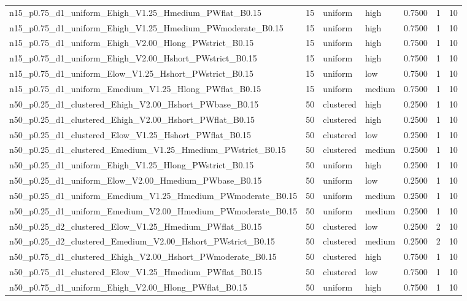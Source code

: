 \begin{tabular}{lrllrrr}
n15_p0.75_d1_uniform_Ehigh_V1.25_Hmedium_PWflat_B0.15 & 15 & uniform & high & 0.7500 & 1 & 10 \\
n15_p0.75_d1_uniform_Ehigh_V1.25_Hmedium_PWmoderate_B0.15 & 15 & uniform & high & 0.7500 & 1 & 10 \\
n15_p0.75_d1_uniform_Ehigh_V2.00_Hlong_PWstrict_B0.15 & 15 & uniform & high & 0.7500 & 1 & 10 \\
n15_p0.75_d1_uniform_Ehigh_V2.00_Hshort_PWstrict_B0.15 & 15 & uniform & high & 0.7500 & 1 & 10 \\
n15_p0.75_d1_uniform_Elow_V1.25_Hshort_PWstrict_B0.15 & 15 & uniform & low & 0.7500 & 1 & 10 \\
n15_p0.75_d1_uniform_Emedium_V1.25_Hlong_PWflat_B0.15 & 15 & uniform & medium & 0.7500 & 1 & 10 \\
n50_p0.25_d1_clustered_Ehigh_V2.00_Hshort_PWbase_B0.15 & 50 & clustered & high & 0.2500 & 1 & 10 \\
n50_p0.25_d1_clustered_Ehigh_V2.00_Hshort_PWflat_B0.15 & 50 & clustered & high & 0.2500 & 1 & 10 \\
n50_p0.25_d1_clustered_Elow_V1.25_Hshort_PWflat_B0.15 & 50 & clustered & low & 0.2500 & 1 & 10 \\
n50_p0.25_d1_clustered_Emedium_V1.25_Hmedium_PWstrict_B0.15 & 50 & clustered & medium & 0.2500 & 1 & 10 \\
n50_p0.25_d1_uniform_Ehigh_V1.25_Hlong_PWstrict_B0.15 & 50 & uniform & high & 0.2500 & 1 & 10 \\
n50_p0.25_d1_uniform_Elow_V2.00_Hmedium_PWbase_B0.15 & 50 & uniform & low & 0.2500 & 1 & 10 \\
n50_p0.25_d1_uniform_Emedium_V1.25_Hmedium_PWmoderate_B0.15 & 50 & uniform & medium & 0.2500 & 1 & 10 \\
n50_p0.25_d1_uniform_Emedium_V2.00_Hmedium_PWmoderate_B0.15 & 50 & uniform & medium & 0.2500 & 1 & 10 \\
n50_p0.25_d2_clustered_Elow_V1.25_Hmedium_PWflat_B0.15 & 50 & clustered & low & 0.2500 & 2 & 10 \\
n50_p0.25_d2_clustered_Emedium_V2.00_Hshort_PWstrict_B0.15 & 50 & clustered & medium & 0.2500 & 2 & 10 \\
n50_p0.75_d1_clustered_Ehigh_V2.00_Hshort_PWmoderate_B0.15 & 50 & clustered & high & 0.7500 & 1 & 10 \\
n50_p0.75_d1_clustered_Elow_V1.25_Hmedium_PWflat_B0.15 & 50 & clustered & low & 0.7500 & 1 & 10 \\
n50_p0.75_d1_uniform_Ehigh_V2.00_Hlong_PWflat_B0.15 & 50 & uniform & high & 0.7500 & 1 & 10 \\

\end{tabular}
